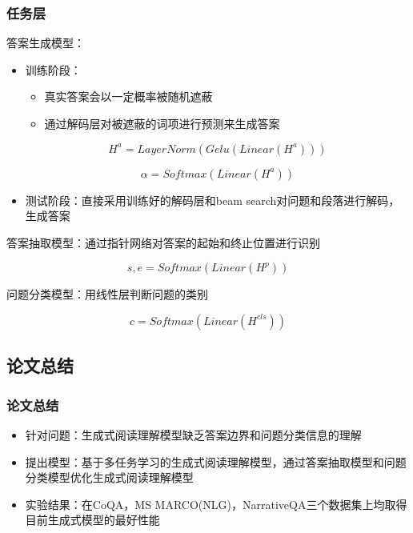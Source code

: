 \documentclass{beamer}
\begin{document}
\begin{frame}
    \frametitle{任务层}

    答案生成模型：

    \begin{itemize}
        \item 训练阶段：
        \begin{itemize}
            \item 真实答案会以一定概率被随机遮蔽
            \item 通过解码层对被遮蔽的词项进行预测来生成答案
        \end{itemize}

        \begin{equation}
            H^a = LayerNorm(Gelu(Linear(H^a)))
        \end{equation}
    
        \begin{equation}
            \alpha = Softmax(Linear(H^a))
        \end{equation}

        \item 测试阶段：直接采用训练好的解码层和beam search对问题和段落进行解码，生成答案
    \end{itemize}

    答案抽取模型：通过指针网络对答案的起始和终止位置进行识别

    \begin{equation}
        s, e = Softmax(Linear(H^p))
    \end{equation}

    问题分类模型：用线性层判断问题的类别

    \begin{equation}
        c = Softmax(Linear(H^{cls}))
    \end{equation}
\end{frame}

\subsection{论文总结}
\begin{frame}
    \frametitle{论文总结}

    \begin{itemize}
        \item 针对问题：生成式阅读理解模型缺乏答案边界和问题分类信息的理解
        \item 提出模型：基于多任务学习的生成式阅读理解模型，通过答案抽取模型和问题分类模型优化生成式阅读理解模型
        \item 实验结果：在CoQA，MS MARCO(NLG)，NarrativeQA三个数据集上均取得目前生成式模型的最好性能
    \end{itemize}

\end{frame}
\end{document}
